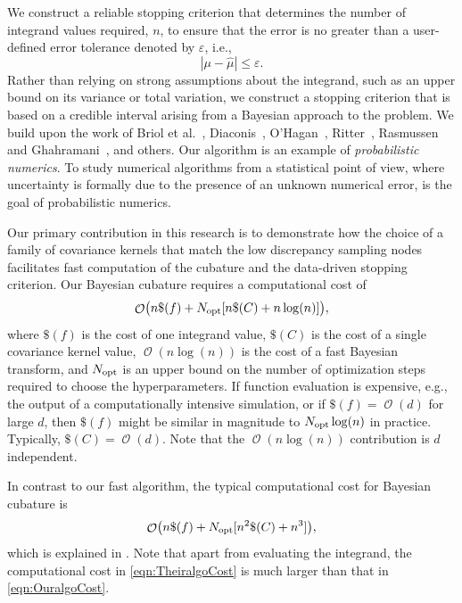 \documentclass{svjour3}                     %
\DeclareMathOperator{\Order}{{\mathcal O}}
\newcommand{\opt}{{\textup{opt}}}
\newcommand{\hmu}{\widehat{\mu}}
\newcommand{\errtol}{\varepsilon}
\def\abs#1{\ensuremath{\left \lvert #1 \right \rvert}}
\begin{document}
We construct a reliable stopping criterion that determines the number of integrand values required, $n$, to ensure that the error is no greater than a user-defined error tolerance denoted by $\varepsilon$, i.e., 
\begin{equation}
\label{eqn:err_crit} 
\abs{\mu - \hmu} \leq \errtol .
\end{equation}
Rather than relying on strong assumptions about the integrand, such as an upper bound on its variance or total variation, we construct a stopping criterion that is based on a credible interval arising from a Bayesian approach to the problem.  We build upon the work of Briol et al.~\cite{BriEtal18a}, Diaconis~\cite{Dia88a}, O'Hagan~\cite{OHa91a}, Ritter~\cite{Rit00a}, Rasmussen and Ghahramani~\cite{RasGha03a}, and others.  Our algorithm is an example of \emph{probabilistic numerics}.
To study numerical algorithms from a statistical point of view, where uncertainty is formally due to the presence of an unknown numerical error, is the goal of probabilistic numerics.




Our primary contribution in this research is to demonstrate how the choice of a family of covariance kernels that match the low discrepancy sampling nodes facilitates fast computation of the cubature and the data-driven stopping criterion.  Our Bayesian cubature requires a computational cost of
\begin{equation} \label{eqn:OuralgoCost}
\Order\bigl(n \$(f) + N_{\opt}[n\$(C) + 
n \log(n)] \bigr),
\end{equation} 
where $\$(f)$ is the cost of one integrand value, $\$(C)$ is the cost of a single covariance kernel value,  $\Order(n \log(n))$ is the cost of a fast Bayesian transform, and $N_{\opt}$ is an upper bound on the number of optimization steps required to choose the hyperparameters. If function evaluation is expensive, e.g., the output of a computationally intensive simulation, or if $\$(f) = \Order(d)$ for large $d$, then $\$(f)$ might be similar in magnitude to $N_{\opt} \log(n)$ in practice.  Typically, $\$(C) = \Order(d)$.  Note that the $\Order(n \log(n))$ contribution is $d$ independent.


In contrast to our fast algorithm, the typical computational cost for Bayesian cubature is
\begin{equation} \label{eqn:TheiralgoCost}
\Order\bigl(n \$(f) + N_{\opt}[n^2\$(C) + n^3] \bigr),
\end{equation} 
which is explained in \cite{JagHic19a}. Note that apart from evaluating the integrand, the computational cost in \eqref{eqn:TheiralgoCost} is much larger than that in \eqref{eqn:OuralgoCost}.  
\end{document}
